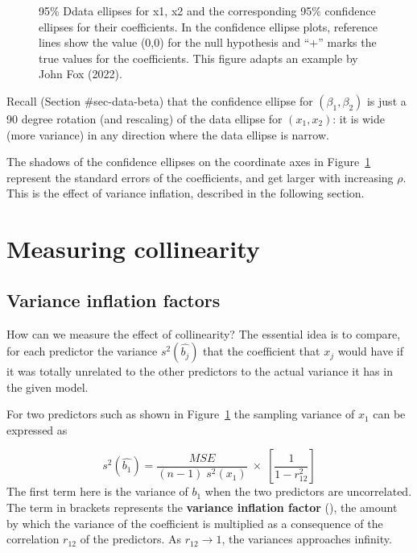 \documentclass[
  letterpaper,
  10pt,
  krantz2]{krantz}
\begin{document}
{\begin{figure}[H]
{}

\caption{\label{fig-collin-data-beta}95\% Ddata ellipses for x1, x2 and
the corresponding 95\% confidence ellipses for their coefficients. In
the confidence ellipse plots, reference lines show the value (0,0) for
the null hypothesis and ``+'' marks the true values for the
coefficients. This figure adapts an example by John Fox (2022).}

\end{figure}%

Recall (Section \#sec-data-beta) that the confidence ellipse for
\((\beta_1, \beta_2)\) is just a 90 degree rotation (and rescaling) of
the data ellipse for \((x_1, x_2)\): it is wide (more variance) in any
direction where the data ellipse is narrow.

The shadows of the confidence ellipses on the coordinate axes in
Figure~\ref{fig-collin-data-beta} represent the standard errors of the
coefficients, and get larger with increasing \(\rho\). This is the
effect of variance inflation, described in the following section.

\section{Measuring collinearity}\label{sec-measure-collin}

\subsection{Variance inflation factors}\label{sec-vif}

How can we measure the effect of collinearity? The essential idea is to
compare, for each predictor the variance \(s^2 (\widehat{b_j})\) that
the coefficient that \(x_j\) would have if it was totally unrelated to
the other predictors to the actual variance it has in the given model.

For two predictors such as shown in Figure~\ref{fig-collin-data-beta}
the sampling variance of \(x_1\) can be expressed as

\[
s^2 (\widehat{b_1}) = \frac{MSE}{(n-1) \; s^2(x_1)} \; \times \; \left[ \frac{1}{1-r^2_{12}} \right]
\] The first term here is the variance of \(b_1\) when the two
predictors are uncorrelated. The term in brackets represents the
\textbf{variance inflation factor}
(), the amount by which
the variance of the coefficient is multiplied as a consequence of the
correlation \(r_{12}\) of the predictors. As \(r_{12} \rightarrow 1\),
the variances approaches infinity.

}
\end{document}

